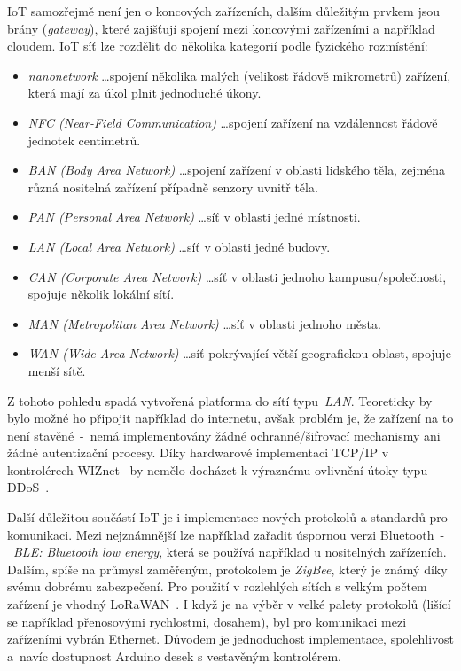 IoT samozřejmě není jen o koncových zařízeních, dalším důležitým prvkem jsou brány (\textit{gateway}), které zajišťují spojení mezi koncovými zařízeními a například cloudem. IoT síť lze rozdělit do několika kategorií \cite{iot_geographic} podle fyzického rozmístění:
\begin{itemize}
  \item \textit{nanonetwork} \ldots spojení několika malých (velikost řádově mikrometrů) zařízení, která mají za úkol plnit jednoduché úkony.
  \item \textit{NFC (Near-Field Communication)} \ldots spojení zařízení na vzdálennost řádově jednotek centimetrů.
  \item \textit{BAN (Body Area Network)} \ldots spojení zařízení v oblasti lidského těla, zejména různá nositelná zařízení případně senzory uvnitř těla.
  \item \textit{PAN (Personal Area Network)} \ldots síť v oblasti jedné místnosti.
  \item \textit{LAN (Local Area Network)} \ldots síť v oblasti jedné budovy.
  \item \textit{CAN (Corporate Area Network)} \ldots síť v oblasti jednoho kampusu/společnosti, spojuje několik lokální sítí.
  \item \textit{MAN (Metropolitan Area Network)} \ldots síť v oblasti jednoho města.
  \item \textit{WAN (Wide Area Network)} \ldots síť pokrývající větší geografickou oblast, spojuje menší sítě.
\end{itemize}
Z tohoto pohledu spadá vytvořená platforma do sítí typu~\textit{LAN}. Teoreticky by bylo možné ho připojit například do internetu, avšak problém je, že zařízení na to není stavěné~-~nemá implementovány žádné ochranné/šifrovací mechanismy ani žádné autentizační procesy. Díky hardwarové implementaci TCP/IP v kontrolérech WIZnet~\cite{datasheet_w5100} by nemělo docházet k výraznému ovlivnění útoky typu DDoS~\cite{ArdIotDDOS}.

Další důležitou součástí IoT je i implementace nových protokolů a standardů pro komunikaci. Mezi nejznámnější lze například zařadit úspornou verzi Bluetooth~-~\textit{BLE: Bluetooth low energy}, která se používá například u nositelných zařízeních. Dalším, spíše na průmysl zaměřeným, protokolem je \textit{ZigBee}, který je známý díky svému dobrému zabezpečení. Pro použití v rozlehlých sítích s velkým počtem zařízení je vhodný \mbox{LoRaWAN}~\cite{IoTprotocols}. I když je na výběr v velké palety  protokolů (lišící se například přenosovými rychlostmi, dosahem), byl pro komunikaci mezi zařízeními vybrán Ethernet. Důvodem je jednoduchost implementace, spolehlivost a~navíc dostupnost Arduino desek s vestavěným kontrolérem.
